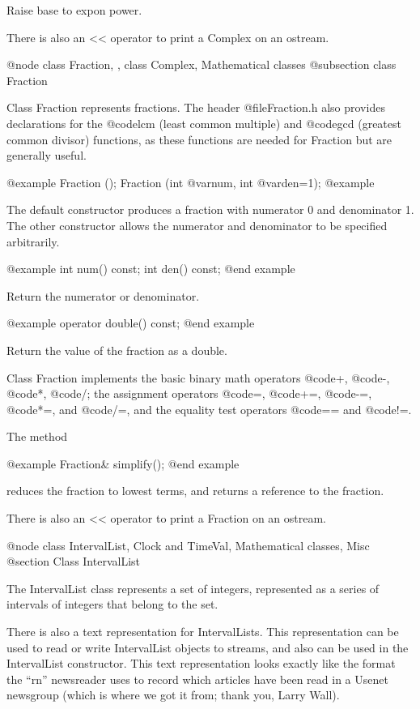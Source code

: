 Raise base to expon power.

There is also an << operator to print a Complex on an ostream.

@node class Fraction,  , class Complex, Mathematical classes
@subsection class Fraction

Class Fraction represents fractions.  The header @file{Fraction.h}
also provides declarations for the @code{lcm} (least common multiple)
and @code{gcd} (greatest common divisor) functions, as these functions
are needed for Fraction but are generally useful.

@example
Fraction ();
Fraction (int @var{num}, int @var{den}=1);
@example

The default constructor produces a fraction with numerator 0 and
denominator 1.  The other constructor allows the numerator and
denominator to be specified arbitrarily.

@example
int num() const;
int den() const;
@end example

Return the numerator or denominator.

@example
operator double() const;
@end example

Return the value of the fraction as a double.

Class Fraction implements the basic binary math operators
@code{+}, @code{-}, @code{*}, @code{/}; the assignment
operators @code{=}, @code{+=}, @code{-=}, @code{*=},
and @code{/=}, and the equality test operators @code{==}
and @code{!=}.

The method

@example
Fraction& simplify();
@end example

reduces the fraction to lowest terms, and returns a reference
to the fraction.

There is also an << operator to print a Fraction on an ostream.

@node class IntervalList, Clock and TimeVal, Mathematical classes, Misc
@section Class IntervalList

The IntervalList class represents a set of integers, represented
as a series of intervals of integers that belong to the set.

There is also a text representation for IntervalLists.  This
representation can be used to read or write IntervalList objects
to streams, and also can be used in the IntervalList constructor.
This text representation looks exactly like the format the ``rn''
newsreader uses to record which articles have been read in a
Usenet newsgroup (which is where we got it from; thank you, Larry
Wall).

